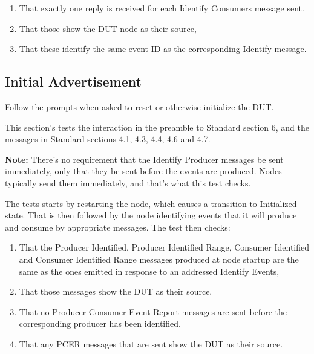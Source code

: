 \documentclass[11pt]{article}
\begin{document}
\begin{enumerate}
\item That exactly one reply is received for each Identify Consumers message sent.
\item That those show the DUT node as their source,
\item That these identify the same event ID as the corresponding Identify message.
\end{enumerate}

\subsection{Initial Advertisement}

Follow the prompts when asked to reset or otherwise initialize the DUT.

This section's tests the interaction in the preamble to Standard section 6, and
the messages in Standard sections 4.1, 4.3, 4.4, 4.6 and 4.7.

\textbf{Note:}  There's no requirement that the Identify Producer messages
be sent immediately, only that they be sent before the events are produced.
Nodes typically send them immediately, and that's what this test checks.

The tests starts by restarting the node, which causes a transition to Initialized
state.  That is then followed by the node identifying events that it will 
produce and consume by appropriate messages. The test then checks:

\begin{enumerate}
\item That the Producer Identified, Producer Identified Range, Consumer Identified 
    and Consumer Identified Range messages produced at node startup are the same
    as the ones emitted in response to an addressed Identify Events,
\item That those messages show the DUT as their source.
\item That no Producer Consumer Event Report messages are sent before the 
    corresponding producer has been identified.
\item That any PCER messages that are sent show the DUT as their source.
\end{enumerate}
\end{document}
